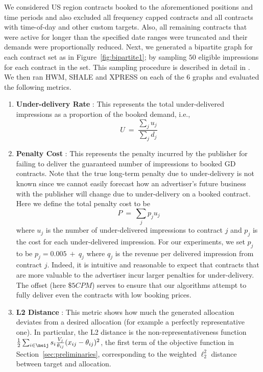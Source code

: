 We considered US region contracts booked to the aforementioned
positions and time periods and also excluded all frequency capped
contracts and all contracts with time-of-day and other custom targets.
Also, all remaining contracts that were
active for longer than the specified date ranges were truncated and
their demands were proportionally reduced. Next, 
we generated a bipartite graph for each contract set as in
Figure~\ref{fig:bipartite1}; by sampling $50$ eligible impressions for each
contract in the set. This sampling procedure is described in detail in
\cite{vvs10}. We then ran HWM, SHALE and XPRESS on each of the 6 graphs
and evaluated the following metrics.
\begin{enumerate}
\item  {\bf Under-delivery Rate} : This represents the total
  under-delivered impressions as a proportion of the booked demand,
  i.e.,
\begin{equation}
\label{eq:under-delivery rate}
U \ = \ \frac{\sum_{j} u_j}{\sum_{j} d_j}
\end{equation}
\item {\bf Penalty Cost} : This represents the penalty incurred
  by the publisher for failing to deliver the guaranteed number of
  impressions to booked GD contracts. Note that the true long-term penalty 
  due to under-delivery  is not known since we cannot easily forecast
  how an advertiser's future business with the publisher will change due to
  under-delivery on a booked contract. Here we define the total
  penalty cost to be
\begin{equation}
\label{eq: penalty cost def}
P \ = \ \sum_{j}p_ju_j
\end{equation}
where $u_j$ is the number of under-delivered impressions to contract
$j$ and $p_j$ is the cost for each under-delivered
impression. For our experiments, we set $p_j$ to be $p_j =
0.005 \ + \ q_j$ where $q_j$ is the revenue per delivered
impression from contract $j$. Indeed, it is intuitive and reasonable
to expect that contracts that are more valuable to the advertiser
incur larger penalties for under-delivery. The offset (here $\$5 CPM$)
serves to ensure that our algorithms attempt to fully deliver even the
contracts with low booking prices.

\item {\bf L2 Distance} : This metric shows how much the generated
  allocation deviates from a desired allocation (for example a
  perfectly representative one). In particular, the L2 distance is
  the non-representativeness function 
  $\frac{1}{2}\sum_{i\in\neij} s_i\frac{V_j}{\theta_{ij}}(x_{ij} - \theta_{ij})^2$,
  the first term of the objective
  function in Section~\ref{sec:preliminaries}, corresponding to the
weighted $\ell_2^2$ distance between target and allocation.
\end{enumerate}

